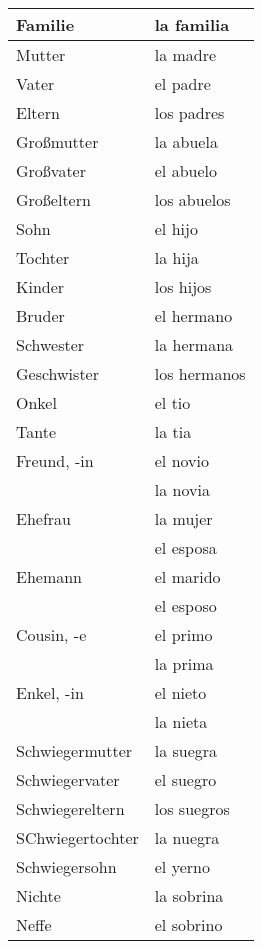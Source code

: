 \documentclass[10pt,spanish]{article}
\begin{document}
\begin{longtable}{p{} | p{}} 
\textbf{Familie}     & \textbf{la familia}                                       \\ \hline
\hline
\endhead %
Mutter &  la madre \\
Vater & el padre \\
Eltern & los padres \\
Großmutter & la abuela \\
Großvater & el abuelo \\
Großeltern & los abuelos \\
Sohn & el hijo \\
Tochter & la hija \\
Kinder & los hijos \\
Bruder & el hermano \\
Schwester & la hermana \\
Geschwister & los hermanos \\
Onkel & el tio \\
Tante & la tia \\
Freund, -in & el novio \\
            & la novia \\
Ehefrau & la mujer \\
        & el esposa \\
Ehemann & el marido \\
        & el esposo \\
Cousin, -e & el primo \\
           & la prima \\
Enkel, -in & el nieto \\
           & la nieta \\
Schwiegermutter & la suegra \\
Schwiegervater & el suegro \\
Schwiegereltern & los suegros \\
SChwiegertochter & la nuegra \\
Schwiegersohn & el yerno \\
Nichte & la sobrina \\
Neffe & el sobrino \\

\end{longtable}
\end{document}
